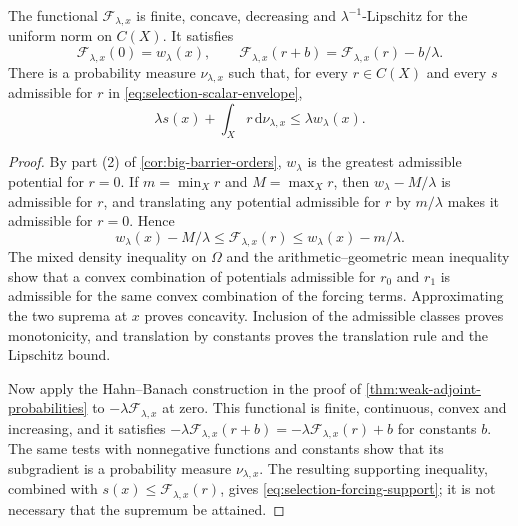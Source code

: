 \begin{lemma}\label{lem:selection-forcing-probability}
The functional $\mathcal F_{\lambda,x}$ is finite, concave, decreasing and $\lambda^{-1}$-Lipschitz for the uniform norm on $C(X)$. It satisfies
\[
 \mathcal F_{\lambda,x}(0)=w_\lambda(x),\qquad
 \mathcal F_{\lambda,x}(r+b)
       =\mathcal F_{\lambda,x}(r)-b/\lambda.
\]
There is a probability measure $\nu_{\lambda,x}$ such that, for every $r\in C(X)$ and every $s$ admissible for $r$ in \eqref{eq:selection-scalar-envelope},
\begin{equation}\label{eq:selection-forcing-support}
 \lambda s(x)+\int_Xr\,\mathrm{d}\nu_{\lambda,x}
       \leq\lambda w_\lambda(x).
\end{equation}
\end{lemma}
\begin{proof}
By part (2) of \cref{cor:big-barrier-orders}, $w_\lambda$ is the greatest admissible potential for $r=0$. If $m=\min_Xr$ and $M=\max_Xr$, then $w_\lambda-M/\lambda$ is admissible for $r$, and translating any potential admissible for $r$ by $m/\lambda$ makes it admissible for $r=0$. Hence
\[
 w_\lambda(x)-M/\lambda\leq\mathcal F_{\lambda,x}(r)
       \leq w_\lambda(x)-m/\lambda.
\]
The mixed density inequality on $\Omega$ and the arithmetic--geometric mean inequality show that a convex combination of potentials admissible for $r_0$ and $r_1$ is admissible for the same convex combination of the forcing terms. Approximating the two suprema at $x$ proves concavity. Inclusion of the admissible classes proves monotonicity, and translation by constants proves the translation rule and the Lipschitz bound.

Now apply the Hahn--Banach construction in the proof of \cref{thm:weak-adjoint-probabilities} to $-\lambda\mathcal F_{\lambda,x}$ at zero. This functional is finite, continuous, convex and increasing, and it satisfies $-\lambda\mathcal F_{\lambda,x}(r+b)=-\lambda\mathcal F_{\lambda,x}(r)+b$ for constants $b$. The same tests with nonnegative functions and constants show that its subgradient is a probability measure $\nu_{\lambda,x}$. The resulting supporting inequality, combined with $s(x)\leq\mathcal F_{\lambda,x}(r)$, gives \eqref{eq:selection-forcing-support}; it is not necessary that the supremum be attained.
\end{proof}

